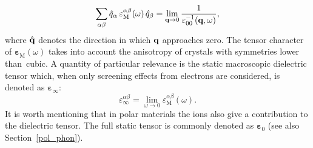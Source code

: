 %
\begin{align}\label{epsmac}
    \sum_{\alpha\beta}\hat{q}_\alpha\,\varepsilon^{\alpha\beta}_\text{M}(\omega)\,\hat{q}_\beta = \lim_{\mathbf{q}\rightarrow 0}\frac{1}{\varepsilon^{-1}_{00}(\mathbf{q},\omega)}, 
\end{align}
%
where $\hat{\mathbf{q}}$ denotes the direction in which $\mathbf{q}$ approaches zero. The tensor character of  $ \boldsymbol{\varepsilon}^{\phantom{I}}_\text{M}(\omega)$ takes into account the anisotropy of crystals with symmetries lower than~cubic\cite{pusching_phd}.
  \newpage
A quantity of particular relevance is the static macroscopic dielectric tensor which, when  only screening effects from electrons are considered, is denoted as $\boldsymbol{\varepsilon}_\infty$:
%
\begin{equation}
   \varepsilon^{\alpha\beta}_\infty = \lim_{\omega\rightarrow 0}\varepsilon^{\alpha\beta}_\text{M}(\omega).
\end{equation}
%
It is worth mentioning that in polar materials the ions also give a contribution to the dielectric tensor. The full static tensor is commonly denoted as $\boldsymbol{\varepsilon}_0$ (see also Section~\ref{pol_phon}).  

 


